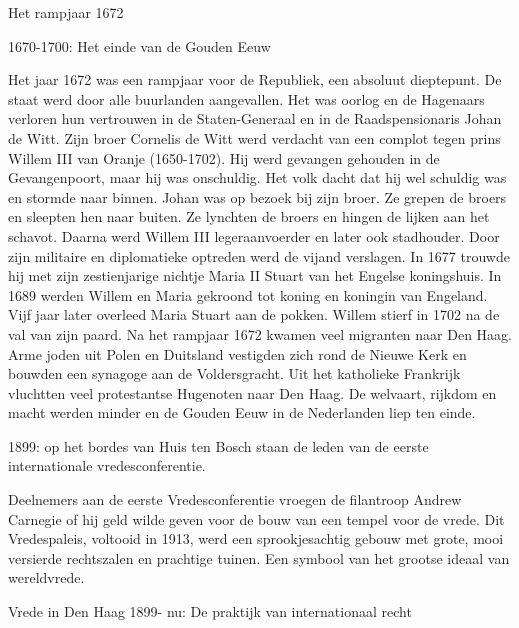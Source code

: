 \documentclass[
  a4paper,
]{book}
\theoremstyle{definition}
\theoremstyle{definition}
\theoremstyle{definition}
\theoremstyle{definition}
\theoremstyle{remark}
\begin{document}
Het rampjaar 1672

1670-1700: Het einde van de Gouden Eeuw

Het jaar 1672 was een rampjaar voor de Republiek, een absoluut dieptepunt.
De staat werd door alle buurlanden aangevallen.
Het was oorlog en de Hagenaars verloren hun vertrouwen in de Staten-Generaal en in
de Raadspensionaris Johan de Witt.
Zijn broer Cornelis de Witt werd verdacht van een complot tegen prins Willem III van Oranje (1650-1702).
Hij werd gevangen gehouden in de Gevangenpoort, maar hij was onschuldig.
Het volk dacht dat hij wel schuldig was en stormde naar binnen.
Johan was op bezoek bij zijn broer.
Ze grepen de broers en sleepten hen naar buiten.
Ze lynchten de broers en hingen de lijken aan het schavot.
Daarna werd Willem III legeraanvoerder en later ook stadhouder.
Door zijn militaire en diplomatieke optreden werd de vijand verslagen.
In 1677 trouwde hij met zijn zestienjarige nichtje Maria II Stuart van het Engelse koningshuis.
In 1689 werden Willem en Maria gekroond tot koning en koningin van Engeland.
Vijf jaar later overleed Maria Stuart aan de pokken.
Willem stierf in 1702 na de val van zijn paard.
Na het rampjaar 1672 kwamen veel migranten naar Den Haag.
Arme joden uit Polen en Duitsland vestigden zich rond de Nieuwe Kerk en bouwden een synagoge aan de Voldersgracht.
Uit het katholieke Frankrijk vluchtten veel protestantse Hugenoten naar Den Haag.
De welvaart, rijkdom en macht werden minder en de Gouden Eeuw in de Nederlanden liep ten einde.

1899: op het bordes van Huis ten Bosch staan de leden van de eerste internationale vredesconferentie.

Deelnemers aan de eerste Vredesconferentie vroegen de filantroop Andrew Carnegie of hij geld wilde geven voor de bouw van een tempel voor de vrede. Dit Vredespaleis, voltooid in 1913, werd een sprookjesachtig gebouw met grote, mooi versierde rechtszalen en prachtige tuinen. Een symbool van het grootse ideaal van wereldvrede.

Vrede in Den Haag
1899- nu: De praktijk van internationaal recht
\end{document}
